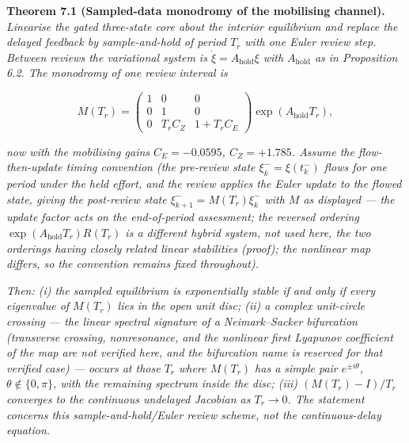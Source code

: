 \documentclass[11pt]{article}
\begin{document}
\textbf{Theorem 7.1 (Sampled-data monodromy of the mobilising channel).}
\emph{Linearise the gated three-state core about the interior
equilibrium and replace the delayed feedback by sample-and-hold of
period \(T_r\) with one Euler review step. Between reviews the
variational system is \(\dot\xi = A_{\mathrm{hold}}\xi\) with
\(A_{\mathrm{hold}}\) as in Proposition 6.2. The monodromy of one review
interval is}

\[M(T_r) = \begin{pmatrix} 1 & 0 & 0 \\ 0 & 1 & 0 \\ 0 & T_r C_Z & 1 + T_r C_E \end{pmatrix} \exp(A_{\mathrm{hold}} T_r), \tag{12}\]

\emph{now with the mobilising gains \(C_E = -0.0595\), \(C_Z = +1.785\).
Assume the flow-then-update timing convention (the pre-review state
\(\xi_k^- = \xi(t_k^-)\) flows for one period under the held effort, and
the review applies the Euler update to the flowed state, giving the
post-review state \(\xi_{k+1}^- = M(T_r)\xi_k^-\) with \(M\) as
displayed --- the update factor acts on the end-of-period assessment;
the reversed ordering \(\exp(A_{\mathrm{hold}}T_r)R(T_r)\) is a
different hybrid system, not used here, the two orderings having closely
related linear stabilities (proof); the nonlinear map differs, so the
convention remains fixed throughout).}

\emph{Then: (i) the sampled equilibrium is exponentially stable if and
only if every eigenvalue of \(M(T_r)\) lies in the open unit disc; (ii)
a complex unit-circle crossing --- the linear spectral signature of a
Neimark--Sacker bifurcation (transverse crossing, nonresonance, and the
nonlinear first Lyapunov coefficient of the map are not verified here,
and the bifurcation name is reserved for that verified case) --- occurs
at those \(T_r\) where \(M(T_r)\) has a simple pair \(e^{\pm i\theta}\),
\(\theta \notin \{0, \pi\}\), with the remaining spectrum inside the
disc; (iii) \((M(T_r) - I)/T_r\) converges to the continuous undelayed
Jacobian as \(T_r \to 0\). The statement concerns this
sample-and-hold/Euler review scheme, not the continuous-delay equation.}
\end{document}
